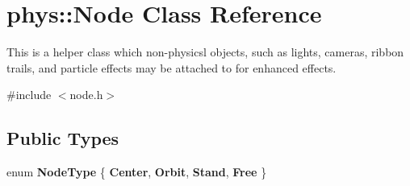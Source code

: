 \hypertarget{classphys_1_1Node}{
\section{phys::Node Class Reference}
\label{d0/ddc/classphys_1_1Node}
}


This is a helper class which non-\/physicsl objects, such as lights, cameras, ribbon trails, and particle effects may be attached to for enhanced effects.  




{\ttfamily \#include $<$node.h$>$}

\subsection*{Public Types}
\begin{DoxyCompactItemize}
\item 
enum {\bfseries NodeType} \{ {\bfseries Center}, 
{\bfseries Orbit}, 
{\bfseries Stand}, 
{\bfseries Free}
 \}
\end{DoxyCompactItemize}
